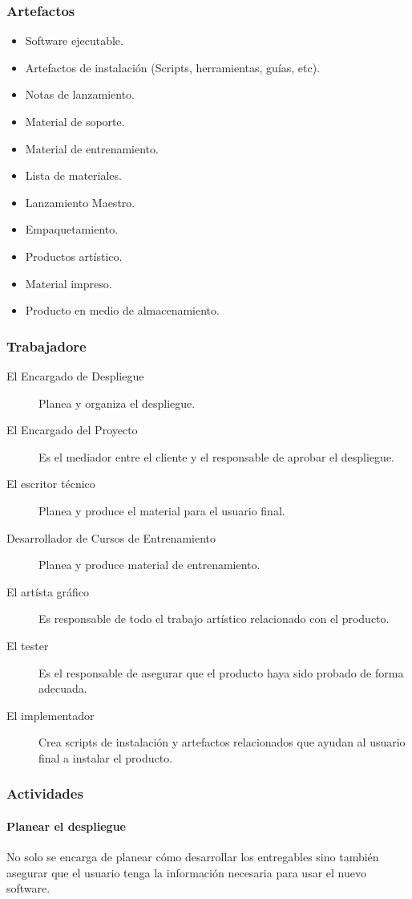 \subsubsection{Artefactos}
\begin{itemize}
	\item Software ejecutable.
	\item Artefactos de instalación (Scripts, herramientas, guías, etc).
	\item Notas de lanzamiento.
	\item Material de soporte.
	\item Material de entrenamiento.
	\item Lista de materiales.
	\item Lanzamiento Maestro.
	\item Empaquetamiento.
	\item Productos artístico.
	\item Material impreso.
	\item Producto en medio de almacenamiento.
\end{itemize}
\subsubsection{Trabajadore}
\begin{description}
	\item[El Encargado de Despliegue] Planea y organiza el despliegue.
	\item[El Encargado del Proyecto] Es el mediador entre el cliente y el responsable de aprobar el despliegue.
	\item[El escritor técnico] Planea y produce el material para el usuario final.
	\item[Desarrollador de Cursos de Entrenamiento] Planea y produce material de entrenamiento.
	\item[El artísta gráfico] Es responsable de todo el trabajo artístico relacionado con el producto.
	\item[El tester] Es el responsable de asegurar que el producto haya sido probado de forma adecuada.
	\item[El implementador] Crea scripts de instalación y artefactos relacionados que ayudan al usuario final a instalar el producto.
\end{description}
\subsubsection{Actividades}
\paragraph{Planear el despliegue}
No solo se encarga de planear cómo desarrollar los entregables sino también asegurar que el usuario tenga la información necesaria para usar el nuevo software.
